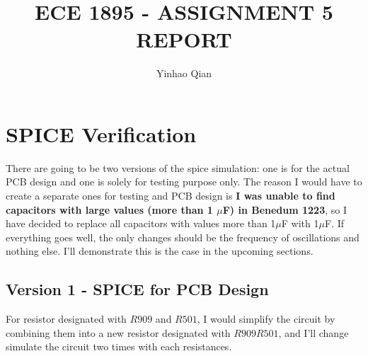 \documentclass{article}
\title{ECE 1895 - ASSIGNMENT 5 REPORT}
\author{Yinhao Qian}
\begin{document}
	\maketitle
	
	\section{SPICE Verification}
	There are going to be two versions of the spice simulation: one is for the actual PCB design and one is solely for testing purpose only. The reason I would have to create a separate ones for testing and PCB design is \textbf{I was unable to find capacitors with large values (more than 1 $\mu$F) in Benedum 1223}, so I have decided to replace all capacitors with values more than 1$\mu$F with 1$\mu$F. If everything goes well, the only changes should be the frequency of oscillations and nothing else. I'll demonstrate this is the case in the upcoming sections.
	
	\subsection{Version 1 - SPICE for PCB Design}
	For resistor designated with $ R909 $ and $ R501 $, I would simplify the circuit by combining them into a new resistor designated with $ R909R501 $, and I'll change simulate the circuit two times with each resistances. \newline
\end{document}
